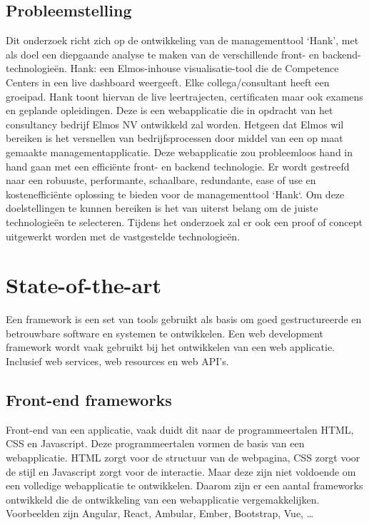 \documentclass{hogent-article}
\begin{document}
  \subsection{Probleemstelling}%
  \label{sub:probleemstelling}
  Dit onderzoek richt zich op de ontwikkeling van de managementtool `Hank', met als doel een diepgaande analyse te maken van de verschillende front- en backend-technologieën. Hank: een Elmos-inhouse visualisatie-tool die de Competence Centers in een live dashboard weergeeft. Elke collega/consultant heeft een groeipad. Hank toont hiervan de live leertrajecten, cer\-ti\-fi\-caten maar ook ex\-amens en geplande opleidingen. Deze is een webapplicatie die in opdracht van het consultancy bedrijf Elmos NV ontwikkeld zal worden. Hetgeen dat Elmos wil bereiken is het versnellen van bedrijfsprocessen door middel van een op maat gemaakte managementapplicatie. Deze webapplicatie zou probleemloos hand in hand gaan met een efficiënte front- en backend technologie.
  \bigbreak
  Er wordt gestreefd naar een robuuste, performante, schaalbare, redundante, ease of use en kostenefficiënte oplossing te bieden voor de managementtool `Hank`. Om deze doelstellingen te kunnen bereiken is het van uiterst belang om de juiste technologieën te selecteren. Tijdens het onderzoek zal er ook een proof of concept uitgewerkt worden met de vastgestelde technologieën.


\section{State-of-the-art}%
\label{sec:state-of-the-art}

Een framework is een set van tools gebruikt als basis om goed gestructureerde en betrouwbare software en systemen te ontwikkelen. Een web development framework wordt vaak gebruikt bij het ontwikkelen van een web applicatie. Inclusief web services, web resources en web API's.

\subsection{Front-end frameworks}%
\label{sub:frontend_frameworks}
Front-end van een applicatie, vaak duidt dit naar de programmeertalen HTML, CSS en Ja\-va\-script. Deze programmeertalen vormen de basis van een webapplicatie. HTML zorgt voor de structuur van de webpagina, CSS zorgt voor de stijl en Ja\-va\-script zorgt voor de interactie. Maar deze zijn niet voldoende om een volledige webapplicatie te ontwikkelen. Daarom zijn er een aantal frameworks ontwikkeld die de ontwikkeling van een webapplicatie vergemakkelijken. 
Voorbeelden zijn Angular, React, Ambular, Ember, Bootstrap, Vue, \ldots\autocite{Jaiswal2022} 
\end{document}
